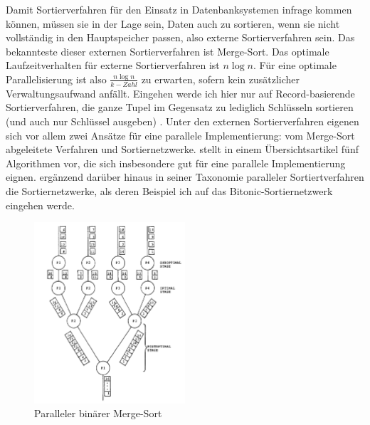 \documentclass[a4paper,12pt,twoside]{article}
\begin{document}
Damit Sortierverfahren für den Einsatz in Datenbanksystemen infrage kommen können, müssen sie in der Lage sein, Daten auch zu sortieren, wenn sie nicht vollständig in den Hauptspeicher passen, also externe Sortierverfahren sein. Das bekannteste dieser externen Sortierverfahren ist Merge-Sort. Das optimale Laufzeitverhalten für externe Sortierverfahren ist $ n \log n $. Für eine optimale Parallelisierung ist also $ \frac{n \log n} {k-Zahl} $ zu erwarten, sofern kein zusätzlicher Verwaltungsaufwand anfällt. Eingehen werde ich hier nur auf Record-basierende Sortierverfahren, die ganze Tupel im Gegensatz zu lediglich Schlüsseln sortieren (und auch nur Schlüssel ausgeben) {\autocite{Salzberg1990}}. Unter den externen Sortierverfahren eigenen sich vor allem zwei Ansätze für eine parallele Implementierung: vom Merge-Sort abgeleitete Verfahren und Sortiernetzwerke. {\textcite[S. 831ff]{Taniar2000}} stellt in einem Übersichtsartikel fünf Algorithmen vor, die sich insbesondere gut für eine parallele Implementierung eignen. {\textcite[S. 9ff] {Bitton1984}} ergänzend darüber hinaus in seiner Taxonomie paralleler Sortiertverfahren die Sortiernetzwerke, als deren Beispiel ich auf das Bitonic-Sortiernetzwerk eingehen werde.

\begin{figure}
	\centering
	\includegraphics[width=0.5\textwidth, angle =90]{Bilder/b-merge-sort.png}
	\caption{Paralleler binärer Merge-Sort \autocite[S. 334]{Bitton1983}}
	\label{img:bMergeSort}
\end{figure}
\end{document}
